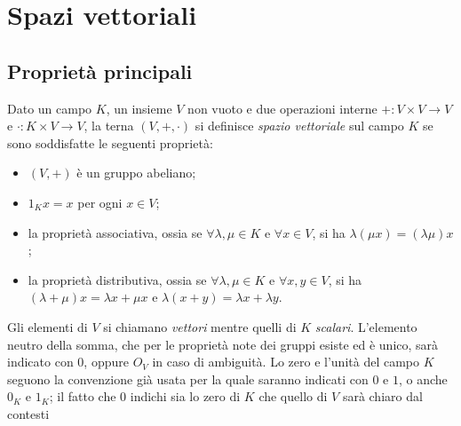 \chapter{Spazi vettoriali} \label{ch:spazi-vettoriali}
\section{Proprietà principali} \label{sec:proprieta-spazi-vettoriali}
\begin{definizione} \label{d:spazio-vettoriale}
	Dato un campo $K$, un insieme $V$ non vuoto e due operazioni interne $+\colon V\times V\to V$ e $\cdot\colon K\times V\to V$, la terna $(V,+,\cdot)$ si definisce \emph{spazio vettoriale} sul campo $K$ se sono soddisfatte le seguenti proprietà:
	\begin{itemize}
		\item $(V,+)$ è un gruppo abeliano;
		\item $1_K x=x$ per ogni $x\in V$;
		\item la proprietà associativa, ossia se $\forall\lambda,\mu\in K$ e $\forall x\in V$, si ha $\lambda(\mu x)=(\lambda\mu) x$;
		\item la proprietà distributiva, ossia se $\forall\lambda,\mu\in K$ e $\forall x,y\in V$, si ha $(\lambda+\mu)x=\lambda  x+\mu x$ e $\lambda(x+y)=\lambda  x+\lambda  y$.
	\end{itemize}
\end{definizione}
Gli elementi di $V$ si chiamano \emph{vettori} mentre quelli di $K$ \emph{scalari}.
L'elemento neutro della somma, che per le proprietà note dei gruppi esiste ed è unico, sarà indicato con $0$, oppure $O_V$ in caso di ambiguità.
Lo zero e l'unità del campo $K$ seguono la convenzione già usata per la quale saranno indicati con $0$ e $1$, o anche $0_K$ e $1_K$; il fatto che $0$ indichi sia lo zero di $K$ che quello di $V$ sarà chiaro dal contesti
